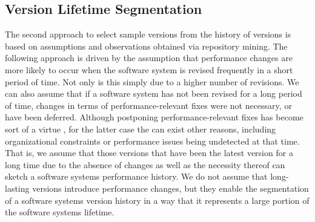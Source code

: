 \subsection{Version Lifetime Segmentation}
The second approach to select sample versions from the history of versions is
based on assumptions and observations obtained via repository mining. The
following approach is driven by the assumption that performance changes are
more likely to occur when the software system is revised frequently in a short
period of time. Not only is this simply due to a higher number of revisions. We
can also assume that if a software system has not been revised for a long
period of time, changes in terms of performance-relevant fixes were not
necessary, or have been deferred. Although postponing performance-relevant
fixes has become sort of a virtue \citep{molyneaux_art_2014}, for the latter
case the can exist other reasons, including organizational constraints or performance
issues being undetected at that time. That is, we assume that those versions
that have been the latest version for a long time due to the absence of changes
as well as the necessity thereof can sketch a software systems performance
history. We do not assume that long-lasting versions introduce performance
changes, but they enable the segmentation of a software systems version history
in a way that it represents a large portion of the software systems lifetime.

